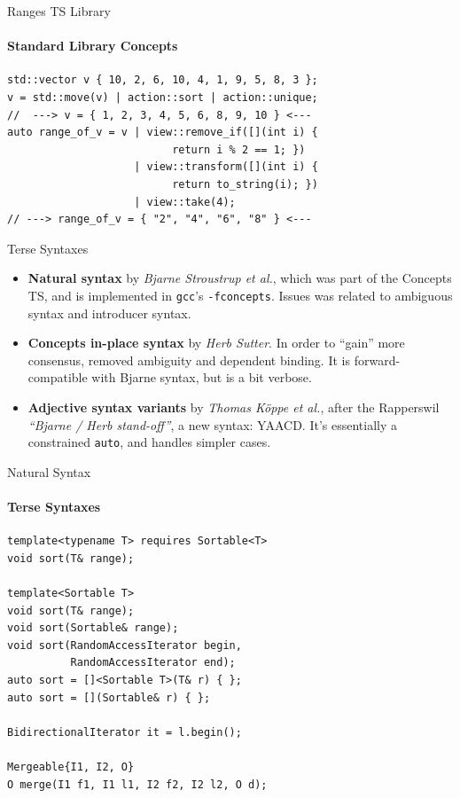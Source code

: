 \documentclass{beamer}
\begin{document}
    \begin{frame}[fragile]{Ranges TS Library}
        \framesubtitle{Standard Library Concepts}
        \begin{center}
        \begin{lstlisting}[caption={example of the composability possibilities of range adaptors.}]
std::vector v { 10, 2, 6, 10, 4, 1, 9, 5, 8, 3 };
v = std::move(v) | action::sort | action::unique;
//  ---> v = { 1, 2, 3, 4, 5, 6, 8, 9, 10 } <--- 
auto range_of_v = v | view::remove_if([](int i) {
                          return i % 2 == 1; })
                    | view::transform([](int i) {
                          return to_string(i); })
                    | view::take(4);
// ---> range_of_v = { "2", "4", "6", "8" } <--- \end{lstlisting}
        \end{center}
    \end{frame}

    \begin{frame}[fragile]{Terse Syntaxes}
        \begin{itemize}
            \item{\textbf{Natural syntax} by \emph{Bjarne Stroustrup et al.}, which was part of the Concepts TS, and is implemented in \texttt{gcc}'s \texttt{-fconcepts}. Issues was related to ambiguous syntax and introducer syntax.}
            \item{\textbf{Concepts in-place syntax} by \emph{Herb Sutter}. In order to ``gain'' more consensus, removed ambiguity and dependent binding. It is forward-compatible with Bjarne syntax, but is a bit verbose.}
            \item{\textbf{Adjective syntax variants} by \emph{Thomas Köppe et al.}, after the Rapperswil \emph{``Bjarne / Herb stand-off''}, a new syntax: YAACD. It's essentially a constrained \texttt{auto}, and handles simpler cases.}
        \end{itemize}
    \end{frame}

    \begin{frame}[fragile]{Natural Syntax}
        \framesubtitle{Terse Syntaxes}
        \begin{center}
        \begin{lstlisting}
template<typename T> requires Sortable<T>
void sort(T& range);

template<Sortable T>
void sort(T& range);
void sort(Sortable& range);
void sort(RandomAccessIterator begin,
          RandomAccessIterator end);
auto sort = []<Sortable T>(T& r) { };
auto sort = [](Sortable& r) { };

BidirectionalIterator it = l.begin();

Mergeable{I1, I2, O}
O merge(I1 f1, I1 l1, I2 f2, I2 l2, O d); \end{lstlisting}
        \end{center}
    \end{frame}
\end{document}
